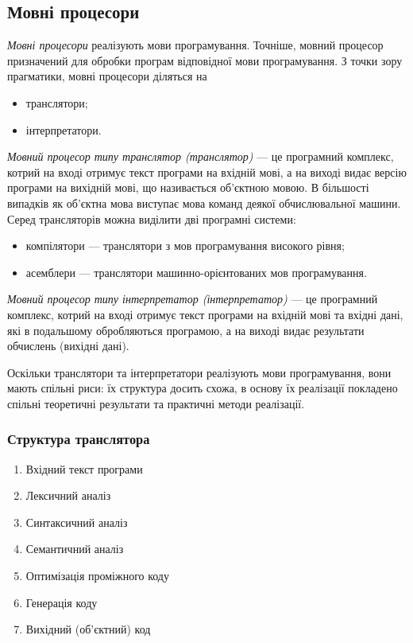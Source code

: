 \subsection{Мовні процесори}

\textit{Мовні процесори} реалізують мови програмування. Точніше, мовний
процесор призначений для обробки програм відповідної мови програмування. З
точки зору прагматики, мовні процесори діляться на
\begin{itemize}
	\item транслятори;
	\item інтерпретатори.
\end{itemize}

\textit{Мовний процесор типу транслятор (транслятор)} --- це програмний
комплекс, котрий на вході отримує текст програми на вхідній мові, а на виході
видає версію програми на вихідній мові, що називається об'єктною мовою. В
більшості випадків як об'єктна мова виступає мова команд деякої обчислювальної
машини. Серед трансляторів можна виділити дві програмні системи:
\begin{itemize}
	\item компілятори --- транслятори з мов програмування високого рівня;
	\item асемблери --- транслятори машинно-орієнтованих мов програмування.
\end{itemize}

\textit{Мовний процесор типу інтерпретатор (інтерпретатор)} --- це програмний
комплекс, котрий на вході отримує текст програми на вхідній мові та вхідні дані,
які в подальшому обробляються програмою, а на виході видає результати
обчислень (вихідні дані). \medskip

Оскільки транслятори та інтерпретатори реалізують мови програмування,
вони мають спільні риси: їх структура досить схожа, в основу їх реалізації
покладено спільні теоретичні результати та практичні методи реалізації.

\subsubsection{Структура транслятора}

\begin{enumerate}
	\item Вхідний текст програми
	\item Лексичний аналіз
	\item Синтаксичний аналіз
	\item Семантичний аналіз
	\item Оптимізація проміжного коду
	\item Генерація коду
	\item Вихідний (об'єктний) код
\end{enumerate}

